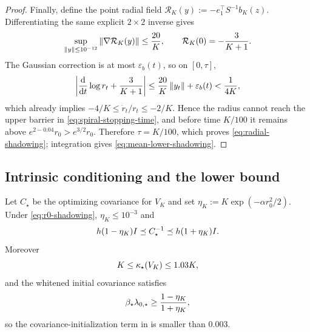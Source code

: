 \begin{proof}
    Finally, define the point radial field $\mathcal R_K(y):=-e_1^\top S^{-1}b_K(z)$.
    Differentiating the same explicit $2\times2$ inverse gives
    \begin{equation*}
        \sup_{\left\lVert y\right\rVert\leq10^{-12}}\left\lVert \nabla\mathcal R_K(y)\right\rVert\leq\frac{20}K,
        \qquad
        \mathcal R_K(0)=-\frac3{K+1} .
    \end{equation*}
    The Gaussian correction is at most $\varepsilon_b(t)$, so on $[0,\tau]$,
    \begin{equation*}
        \left|\frac{\mathrm{d}}{\mathrm{d} t}\log r_t+\frac3{K+1}\right|
        \leq\frac{20}K\left\lVert y_t\right\rVert+\varepsilon_b(t)
        <\frac1{4K},
    \end{equation*}
    which already implies $-4/K\leq\dot r_t/r_t\leq-2/K$. Hence the radius cannot reach the
    upper barrier in \eqref{eq:spiral-stopping-time}, and before time $K/100$ it remains above
    $e^{2-0.04}r_0>e^{3/2}r_0$. Therefore $\tau=K/100$, which proves
    \eqref{eq:radial-shadowing}; integration gives \eqref{eq:mean-lower-shadowing}.
\end{proof}

\subsection{Intrinsic conditioning and the lower bound}

\begin{lemma}\label{lem:spiral-kappa}
    Let $C_\star$ be the optimizing covariance for $V_K$ and set
    $\eta_K:=K\exp(-\alpha r_0^2/2)$. Under \eqref{eq:r0-shadowing}, $\eta_K\leq10^{-3}$ and
    \begin{equation}\label{eq:spiral-Pstar}
        h(1-\eta_K)I\preceq C_\star^{-1}\preceq h(1+\eta_K)I .
    \end{equation}
    Moreover
    \begin{equation}\label{eq:spiral-kappa-star}
        K\leq\kappa_\star(V_K)\leq1.03K,
    \end{equation}
    and the whitened initial covariance satisfies
    \begin{equation}\label{eq:spiral-initial-product}
        \beta_\star\lambda_{0,\star}\geq\frac{1-\eta_K}{1+\eta_K},
    \end{equation}
    so the covariance-initialization term in  is smaller than $0.003$.
\end{lemma}

